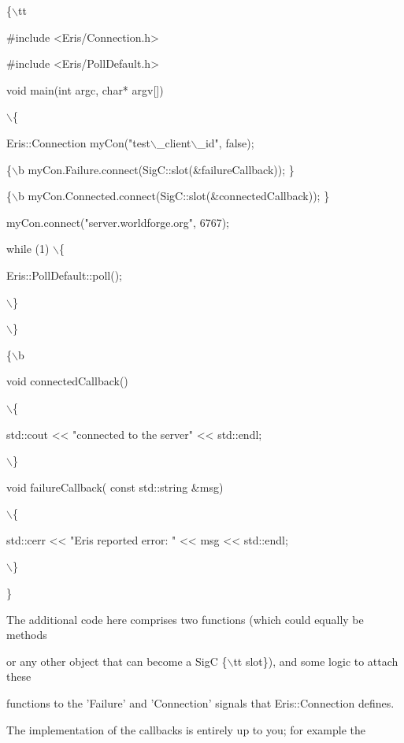 \documentclass[12pt]{article}
\begin{document}
\{\ensuremath{\backslash}tt



\#include <Eris/Connection.h>

\#include <Eris/PollDefault.h>



void main(int argc, char* argv[])

\ensuremath{\backslash}\{

    Eris::Connection myCon("test\ensuremath{\backslash}\_client\ensuremath{\backslash}\_id", false);

    

    \{\ensuremath{\backslash}b myCon.Failure.connect(SigC::slot(\&failureCallback)); \}

    \{\ensuremath{\backslash}b myCon.Connected.connect(SigC::slot(\&connectedCallback)); \}

    myCon.connect("server.worldforge.org", 6767);

    

    while (1) \ensuremath{\backslash}\{

	Eris::PollDefault::poll();

    \ensuremath{\backslash}\}

\ensuremath{\backslash}\}



\{\ensuremath{\backslash}b

void connectedCallback()

\ensuremath{\backslash}\{

    std::cout << "connected to the server" << std::endl;

\ensuremath{\backslash}\}



void failureCallback( const std::string \&msg)

\ensuremath{\backslash}\{

    std::cerr << "Eris reported error: " << msg << std::endl;

\ensuremath{\backslash}\}

\}



The additional code here comprises two functions (which could equally be methods

or any other object that can become a SigC \{\ensuremath{\backslash}tt slot\}), and some logic to attach these

functions to the 'Failure' and 'Connection' signals that Eris::Connection defines.

The implementation of the callbacks is entirely up to you; for example the
\end{document}
